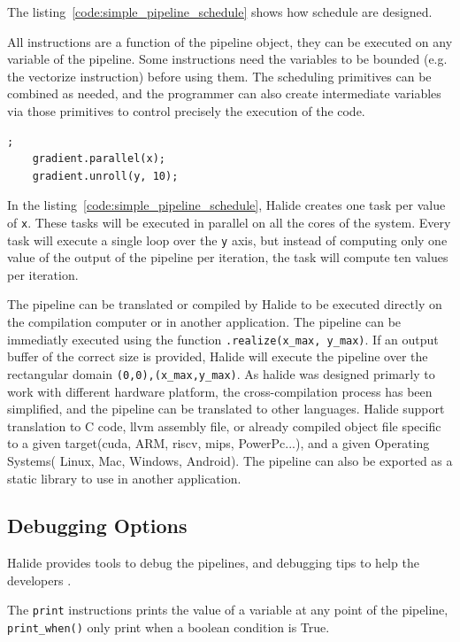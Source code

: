 	The listing~\ref{code:simple_pipeline_schedule} shows how schedule are designed.

	All instructions are a function of the pipeline object, they can be executed on any variable of the  pipeline. Some instructions need the variables to be bounded (e.g. the vectorize instruction) before using them.
	The scheduling primitives can be combined as needed, and the programmer can also create intermediate variables via those primitives to control precisely the execution of the code.


	\begin{lstlisting}[caption={Simple Pipeline Example}, captionpos=b,label={code:simple_pipeline_schedule}];
	gradient.parallel(x);
	gradient.unroll(y, 10);
	\end{lstlisting}

	In the listing~\ref{code:simple_pipeline_schedule},
 	Halide creates one task per value of \verb|x|. These tasks will be executed in parallel on all the cores of the system. Every task will execute a single loop over the \verb|y| axis, but instead of computing only one value of the output of the pipeline per iteration, the task will compute ten values per iteration.


	The pipeline can be translated or compiled by Halide to be executed directly on the compilation computer or in another application.
	The pipeline can be immediatly executed using the function \texttt{.realize(x\_max, y\_max)}. If an output buffer of the correct size is provided, Halide will execute the pipeline over the rectangular domain \texttt{(0,0),(x\_max,y\_max)}.
	 As halide was designed primarly to work with different hardware platform, the  cross-compilation process  has been simplified, and the pipeline can be translated to other languages.
	 Halide support translation to C code, \gls{llvm} assembly file, or already compiled object file specific to a given target(\gls{cuda}, ARM, \gls{riscv}, \gls{mips}, PowerPc...), and a given Operating Systems( Linux, Mac, Windows, Android). The pipeline can also be exported as a static library to use in another application.

\subsection{Debugging Options}

	Halide provides tools to debug the pipelines, and debugging tips to help the developers \cite{Web:HalideDebug}.

	The \texttt{print} instructions prints the value of a variable at any point of the pipeline, \texttt{print\_when()} only print when a boolean condition is True.

